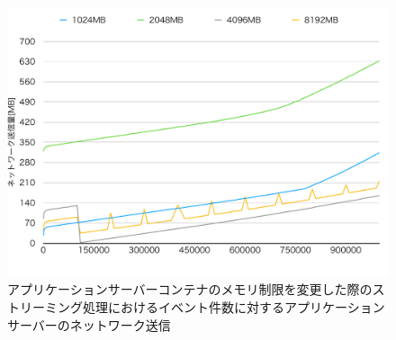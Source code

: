 \documentclass[../../../../../main]{subfiles}
\begin{document}
    \begin{figure}[H]
        \centering
        \includegraphics[width=12cm]{graph}
        \caption{アプリケーションサーバーコンテナのメモリ制限を変更した際のストリーミング処理におけるイベント件数に対するアプリケーションサーバーのネットワーク送信}
        \label{fig:stream-change-app-memory-limit-app-net-out-app_4_db_1_1024}
    \end{figure}
\end{document}
